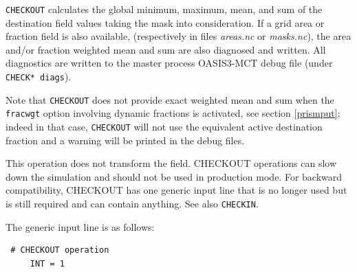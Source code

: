 \begin{itemize}
  {\tt CHECKOUT} calculates the global minimum, maximum, mean, and 
  sum of the destination field values taking the mask into consideration.  If a grid area
  or fraction field is also available, (respectively in files {\it
    areas.nc} or {\it masks.nc}), the area and/or fraction weighted
  mean and sum are also diagnosed and written.  All diagnostics are
  written to the master  process OASIS3-MCT debug file (under {\tt CHECK* diags}).

  Note that {\tt CHECKOUT} does not provide exact weighted mean and sum when the {\tt fracwgt} option involving dynamic fractions is activated, see section \ref{prismput}; indeed in that case, {\tt CHECKOUT} will not use the equivalent active destination fraction and a warning will be printed in the debug files.

  This operation does not transform the field. CHECKOUT operations can
  slow down the simulation and should not be used in
  production mode.  For backward compatibility, CHECKOUT has one generic
  input line that is no longer used but is still required and can contain anything.
  See also {\tt CHECKIN}.

  The generic input line is as follows:
 \begin{verbatim}
 # CHECKOUT operation
     INT = 1  
\end{verbatim} 

\end{itemize}


